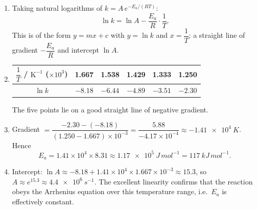 \documentclass[11pt]{article}
\begin{document}
\begin{corrige}
\begin{enumerate}
\item Taking natural logarithms of $k = A\,e^{-E_a/(RT)}$:
\[ \ln k = \ln A - \frac{E_a}{R}\cdot\frac{1}{T}. \]
This is of the form $y = mx + c$ with $y = \ln k$ and $x = \dfrac{1}{T}$: a straight line of gradient $-\dfrac{E_a}{R}$ and intercept $\ln A$.
\item
\begin{center}
\begin{tabular}{|c|c|c|c|c|c|}
\hline
\rowcolor{popblueL} $\dfrac{1}{T}$ / $\mathrm{K^{-1}}$ ($\times 10^{3}$) & 1.667 & 1.538 & 1.429 & 1.333 & 1.250 \\
\hline $\ln k$ & $-8.18$ & $-6.44$ & $-4.89$ & $-3.51$ & $-2.30$ \\
\hline
\end{tabular}
\end{center}
The five points lie on a good straight line of negative gradient.
\item Gradient $= \dfrac{-2.30 - (-8.18)}{(1.250 - 1.667)\times 10^{-3}} = \dfrac{5.88}{-4.17\times 10^{-4}} \approx \SI{-1.41e4}{K}$. Hence
\[ E_a = 1.41\times 10^{4} \times 8.31 \approx \SI{1.17e5}{J\,mol^{-1}} = \SI{117}{kJ\,mol^{-1}}. \]
\item Intercept: $\ln A \approx -8.18 + 1.41\times 10^{4} \times 1.667\times 10^{-3} \approx 15.3$, so $A \approx e^{15.3} \approx \SI{4.4e6}{s^{-1}}$. The excellent linearity confirms that the reaction obeys the Arrhenius equation over this temperature range, i.e.\ $E_a$ is effectively constant.
\end{enumerate}
\end{corrige}
\end{document}
